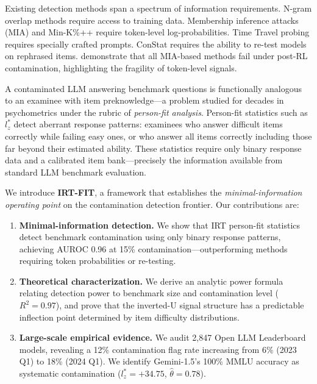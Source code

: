 \documentclass[11pt,a4paper]{article}
\begin{document}
Existing detection methods span a spectrum of information requirements. N-gram overlap methods require access to training data. Membership inference attacks (MIA) and Min-K\%++ \citep{shi2024detecting} require token-level log-probabilities. Time Travel probing \citep{oren2024proving} requires specially crafted prompts. ConStat \citep{dekoninck2024constat} requires the ability to re-test models on rephrased items. \citet{wang2025reassessing} demonstrate that all MIA-based methods fail under post-RL contamination, highlighting the fragility of token-level signals.

A contaminated LLM answering benchmark questions is functionally analogous to an examinee with item preknowledge---a problem studied for decades in psychometrics under the rubric of \emph{person-fit analysis}. Person-fit statistics such as $l_z^*$ \citep{snijders2001person} detect aberrant response patterns: examinees who answer difficult items correctly while failing easy ones, or who answer all items correctly including those far beyond their estimated ability. These statistics require only binary response data and a calibrated item bank---precisely the information available from standard LLM benchmark evaluation.

We introduce \textbf{IRT-FIT}, a framework that establishes the \emph{minimal-information operating point} on the contamination detection frontier. Our contributions are:

\begin{enumerate}
    \item \textbf{Minimal-information detection.} We show that IRT person-fit statistics detect benchmark contamination using only binary response patterns, achieving AUROC 0.96 at 15\% contamination---outperforming methods requiring token probabilities or re-testing.
    \item \textbf{Theoretical characterization.} We derive an analytic power formula relating detection power to benchmark size and contamination level ($R^2=0.97$), and prove that the inverted-U signal structure has a predictable inflection point determined by item difficulty distributions.
    \item \textbf{Large-scale empirical evidence.} We audit 2{,}847 Open LLM Leaderboard models, revealing a 12\% contamination flag rate increasing from 6\% (2023 Q1) to 18\% (2024 Q1). We identify Gemini-1.5's 100\% MMLU accuracy as systematic contamination ($l_z^*=+34.75$, $\hat{\theta}=0.78$).
\end{enumerate}
\end{document}

